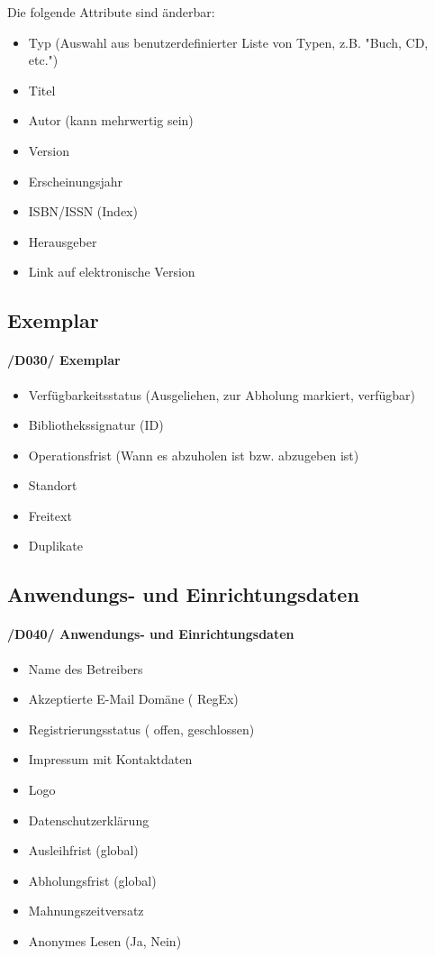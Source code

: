 \documentclass{article}
\begin{document}
	   Die folgende Attribute sind änderbar:
	   	\begin{itemize}
	   \item Typ (Auswahl aus benutzerdefinierter Liste von Typen, z.B. "Buch, CD, etc.")
	   \item Titel
	   \item Autor (kann mehrwertig  sein)
	   \item Version
	   \item Erscheinungsjahr
	   \item ISBN/ISSN (Index) 
	   \item Herausgeber
	   \item Link auf elektronische Version
	    
	\end{itemize}
		
	\subsection{Exemplar}
	\label{D030} \paragraph{/D030/ Exemplar}
	\begin{itemize}
        \item Verfügbarkeitsstatus (Ausgeliehen, zur Abholung markiert, verfügbar)
	    \item Bibliothekssignatur (ID)
	    \item Operationsfrist (Wann es abzuholen ist bzw. abzugeben ist)
	    \item Standort
	    \item Freitext
	    \item Duplikate
	   	\end{itemize}
	   	



	\subsection{Anwendungs- und Einrichtungsdaten}
	\label{D040} \paragraph{/D040/ Anwendungs- und Einrichtungsdaten}
	\begin{itemize}
		\item Name des Betreibers
		\item Akzeptierte E-Mail Domäne ( RegEx)
		\item Registrierungsstatus ( offen, geschlossen)
		\item Impressum mit Kontaktdaten
		\item Logo
		\item Datenschutzerklärung
		\item Ausleihfrist (global)
        \item Abholungsfrist (global)
        \item Mahnungszeitversatz
        \item Anonymes Lesen (Ja, Nein)
        
	\end{itemize}
	
\end{document}
